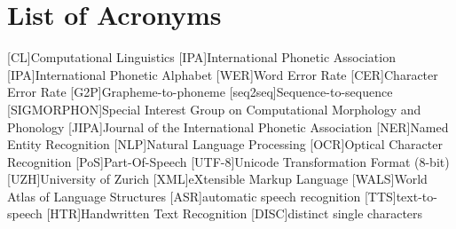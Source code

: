 {}
\chapter*{List of Acronyms}
\begin{acronym}
[CL]{Computational Linguistics}
[IPA]{International Phonetic Association}
[IPA]{International Phonetic Alphabet}
[WER]{Word Error Rate}
[CER]{Character Error Rate}
[G2P]{Grapheme-to-phoneme} 
[seq2seq]{Sequence-to-sequence} 
[SIGMORPHON]{Special Interest Group on Computational  Morphology and Phonology}
[JIPA]{Journal of the International Phonetic Association}
[NER]{Named Entity Recognition}
[NLP]{Natural Language Processing}
[OCR]{Optical Character Recognition}
[PoS]{Part-Of-Speech}
[UTF-8]{Unicode Transformation Format (8-bit)}
[UZH]{University of Zurich}
[XML]{eXtensible Markup Language}
[WALS]{World Atlas of Language Structures}
[ASR]{automatic speech recognition}
[TTS]{text-to-speech}
[HTR]{Handwritten Text Recognition}
[DISC]{distinct single characters}
\end{acronym}